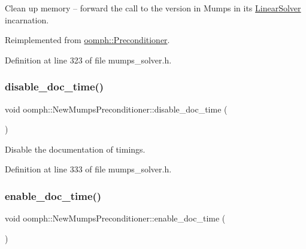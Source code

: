 Clean up memory -- forward the call to the version in Mumps in its \hyperlink{classoomph_1_1LinearSolver}{Linear\+Solver} incarnation. 



Reimplemented from \hyperlink{classoomph_1_1Preconditioner_a46c31c416829bedcd9db238431262027}{oomph\+::\+Preconditioner}.



Definition at line 323 of file mumps\+\_\+solver.\+h.

\mbox{\label{classoomph_1_1NewMumpsPreconditioner_a8c01fbbb656c21c756c44be322a600b2}} 
\subsubsection{\texorpdfstring{disable\+\_\+doc\+\_\+time()}{disable\_doc\_time()}}
{\footnotesize\ttfamily void oomph\+::\+New\+Mumps\+Preconditioner\+::disable\+\_\+doc\+\_\+time (\begin{DoxyParamCaption}{ }\end{DoxyParamCaption})\hspace{0.3cm}{\ttfamily [inline]}}



Disable the documentation of timings. 



Definition at line 333 of file mumps\+\_\+solver.\+h.

\mbox{\label{classoomph_1_1NewMumpsPreconditioner_a2946bc9182e015a12471a5e225473e9a}} 
\subsubsection{\texorpdfstring{enable\+\_\+doc\+\_\+time()}{enable\_doc\_time()}}
{\footnotesize\ttfamily void oomph\+::\+New\+Mumps\+Preconditioner\+::enable\+\_\+doc\+\_\+time (\begin{DoxyParamCaption}{ }\end{DoxyParamCaption})\hspace{0.3cm}{\ttfamily [inline]}}



